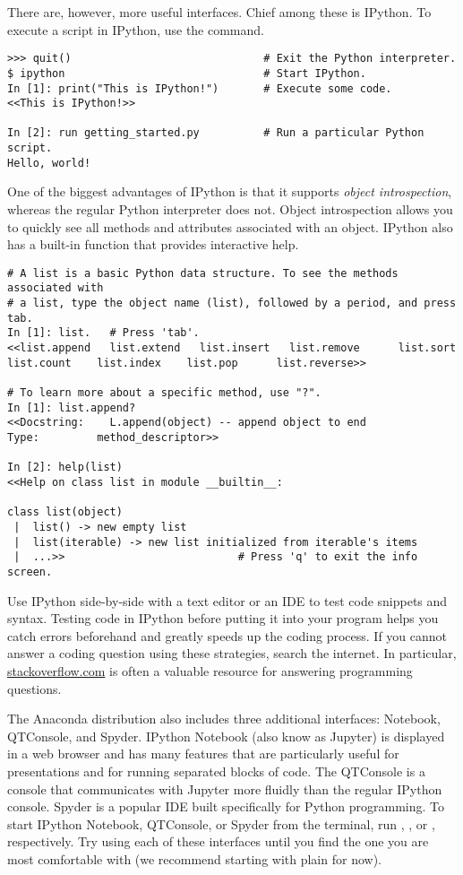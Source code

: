 There are, however, more useful interfaces.
Chief among these is IPython.
To execute a script in IPython, use the  command.

\begin{lstlisting}
>>> quit()                              # Exit the Python interpreter.
$ ipython                               # Start IPython.
In [1]: print("This is IPython!")       # Execute some code.
<<This is IPython!>>

In [2]: run getting_started.py          # Run a particular Python script.
Hello, world!
\end{lstlisting}

One of the biggest advantages of IPython is that it supports \emph{object introspection}, whereas the regular Python interpreter does not.
Object introspection allows you to quickly see all methods and attributes associated with an object.
IPython also has a built-in  function that provides interactive help.

\begin{lstlisting}
# A list is a basic Python data structure. To see the methods associated with
# a list, type the object name (list), followed by a period, and press tab.
In [1]: list.   # Press 'tab'.
<<list.append   list.extend   list.insert   list.remove      list.sort
list.count    list.index    list.pop      list.reverse>>

# To learn more about a specific method, use "?".
In [1]: list.append?
<<Docstring:    L.append(object) -- append object to end
Type:         method_descriptor>>

In [2]: help(list)
<<Help on class list in module __builtin__:

class list(object)
 |  list() -> new empty list
 |  list(iterable) -> new list initialized from iterable's items
 |  ...>>                           # Press 'q' to exit the info screen.
\end{lstlisting}

Use IPython side-by-side with a text editor or an IDE to test code snippets and syntax.
Testing code in IPython before putting it into your program helps you catch errors beforehand and greatly speeds up the coding process.
If you cannot answer a coding question using these strategies, search the internet.
In particular, \href{http://stackoverflow.com/}{stackoverflow.com} is often a valuable resource for answering programming questions.

The Anaconda distribution also includes three additional interfaces: Notebook, QTConsole, and Spyder.
IPython Notebook (also know as Jupyter) is displayed in a web browser and has many features that are particularly useful for presentations and for running separated blocks of code.
The QTConsole is a console that communicates with Jupyter more fluidly than the regular IPython console.
Spyder is a popular IDE built specifically for Python programming.
To start IPython Notebook, QTConsole, or Spyder from the terminal, run , , or , respectively.
Try using each of these interfaces until you find the one you are most comfortable with (we recommend starting with plain  for now).

